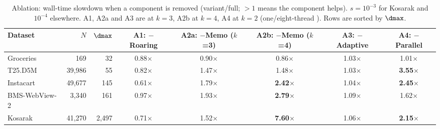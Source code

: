 \begin{table}[t]
\caption{Ablation: wall-time slowdown when a component is removed
(variant/full; $>1$ means the component helps). $s=10^{-3}$ for Kosarak and
$10^{-4}$ elsewhere. A1, A2a and A3 are at $k\!=\!3$, A2b at $k\!=\!4$, A4 at
$k\!=\!2$ (one/eight-thread \fast{}). Rows are sorted by $\dmax$.}\label{tab:ablation}
\small\setlength{\tabcolsep}{6pt}
\begin{tabular*}{\textwidth}{@{\extracolsep{\fill}}lrrccccc@{}}
\toprule
Dataset & $N$ & $\dmax$ & A1: $-$Roaring & A2a: $-$Memo ($k$=3) & A2b: $-$Memo ($k$=4) & A3: $-$Adaptive & A4: $-$Parallel\\
\midrule
Groceries     & 169 & 32 & 0.88$\times$ & 0.90$\times$ & 0.86$\times$ & 1.03$\times$ & 1.01$\times$\\
T25.D5M       & 39{,}986 & 55 & 0.82$\times$ & 1.47$\times$ & 1.48$\times$ & 1.03$\times$ & \textbf{3.55$\times$}\\
Instacart     & 49{,}677 & 145 & 0.61$\times$ & 1.79$\times$ & \textbf{2.42$\times$} & 1.04$\times$ & \textbf{2.45$\times$}\\
BMS-WebView-2 & 3{,}340 & 161 & 0.97$\times$ & 1.93$\times$ & \textbf{2.79$\times$} & 1.09$\times$ & 1.62$\times$\\
Kosarak       & 41{,}270 & 2{,}497 & 0.71$\times$ & 1.52$\times$ & \textbf{7.60$\times$} & 1.06$\times$ & \textbf{2.15$\times$}\\
\bottomrule
\end{tabular*}
\end{table}

